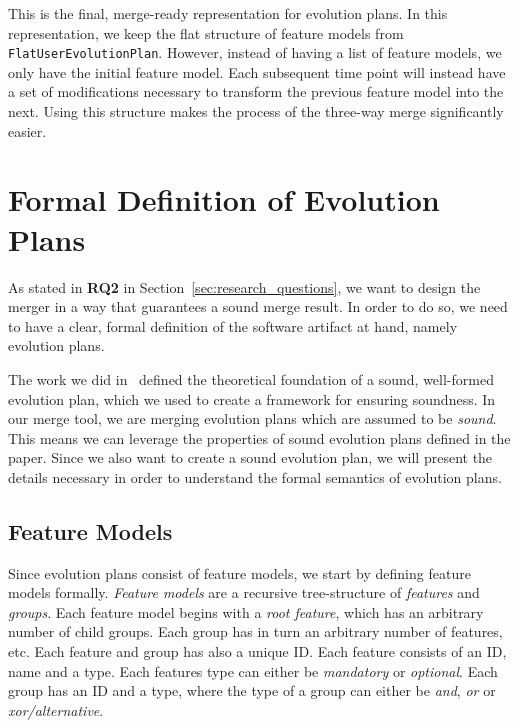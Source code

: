 \documentclass[a4paper,english]{ifimaster}
\begin{document}
This is the final, merge-ready representation for evolution plans. In this representation, we keep the flat structure of feature models from \texttt{Flat\-User\-Evolution\-Plan}. However, instead of having a list of feature models, we only have the initial feature model. Each subsequent time point will instead have a set of modifications necessary to transform the previous feature model into the next. Using this structure makes the process of the three-way merge significantly easier.

\section{Formal Definition of Evolution Plans}%
\label{sec:formal_definition_of_evolution_plans}

As stated in \textbf{RQ2} in Section~\vref{sec:research_questions}, we want to design the merger in a way that guarantees a sound merge result. In order to do so, we need to have a clear, formal definition of the software artifact at hand, namely evolution plans.

The work we did in~\cite{cite:consistency_preserving_evolution_planning} defined the theoretical foundation of a sound, well-formed evolution plan, which we used to create a framework for ensuring soundness. In our merge tool, we are merging evolution plans which are assumed to be \textit{sound}. This means we can leverage the properties of sound evolution plans defined in the paper. Since we also want to create a sound evolution plan, we will present the details necessary in order to understand the formal semantics of evolution plans.

\subsection{Feature Models}%
\label{sub:feature_models}

Since evolution plans consist of feature models, we start by defining feature models formally. \textit{Feature models} are a recursive tree-structure of \textit{features} and \textit{groups}. Each feature model begins with a \textit{root feature}, which has an arbitrary number of child groups. Each group has in turn an arbitrary number of features, etc. Each feature and group has also a unique ID. Each feature consists of an ID, name and a type. Each features type can either be \textit{mandatory} or \textit{optional}. Each group has an ID and a type, where the type of a group can either be \textit{and}, \textit{or} or \textit{xor/alternative}.
\end{document}

